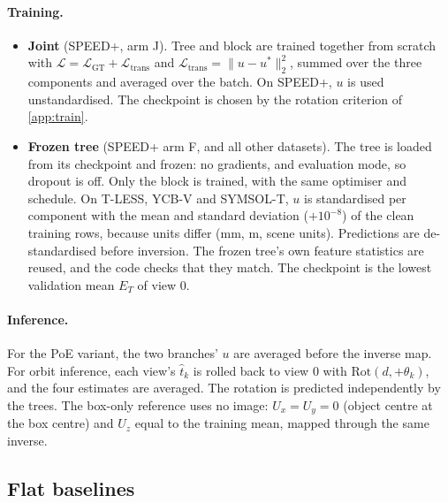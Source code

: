 \paragraph{Training.}
\begin{itemize}
  \item \textbf{Joint} (SPEED+, arm J). Tree and block are trained together from scratch with $\mathcal{L}=\mathcal{L}_{\text{GT}}+\mathcal{L}_{\text{trans}}$ and $\mathcal{L}_{\text{trans}}=\|u-u^*\|_2^2$, summed over the three components and averaged over the batch. On SPEED+, $u$ is used unstandardised. The checkpoint is chosen by the rotation criterion of \cref{app:train}.
  \item \textbf{Frozen tree} (SPEED+ arm F, and all other datasets). The tree is loaded from its checkpoint and frozen: no gradients, and evaluation mode, so dropout is off. Only the block is trained, with the same optimiser and schedule. On T-LESS, YCB-V and SYMSOL-T, $u$ is standardised per component with the mean and standard deviation ($+10^{-8}$) of the clean training rows, because units differ (mm, m, scene units). Predictions are de-standardised before inversion. The frozen tree's own feature statistics are reused, and the code checks that they match. The checkpoint is the lowest validation mean $E_T$ of view 0.
\end{itemize}

\paragraph{Inference.}
For the PoE variant, the two branches' $u$ are averaged before the inverse map. For orbit inference, each view's $\hat t_k$ is rolled back to view 0 with $\mathrm{Rot}(d,+\theta_k)$, and the four estimates are averaged. The rotation is predicted independently by the trees. The box-only reference uses no image: $U_x=U_y=0$ (object centre at the box centre) and $U_z$ equal to the training mean, mapped through the same inverse.

\subsection{Flat baselines}\label{app:flat}

